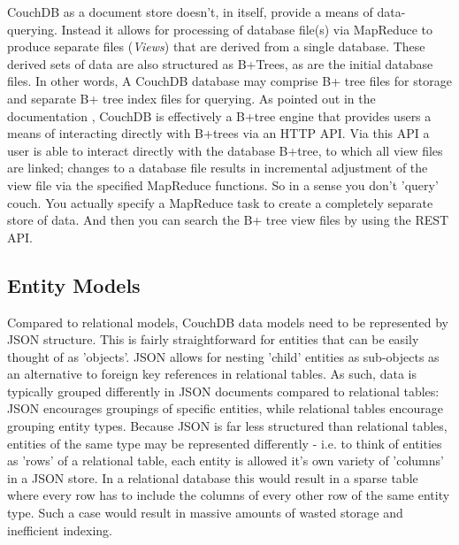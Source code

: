 CouchDB as a document store doesn't, in itself, provide a means of data-querying. Instead it allows for processing of database file(s) via MapReduce to produce separate files (\textit{Views}) that are derived from a single database. These derived sets of data are also structured as B+Trees, as are the initial database files. In other words, A CouchDB database may comprise B+ tree files for storage and separate B+ tree index files for querying. As pointed out in the documentation \cite{couchguide}, CouchDB is effectively a B+tree engine that provides users a means of interacting directly with B+trees via an HTTP API. Via this API a user is able to interact directly with the database B+tree, to which all view files are linked; changes to a database file results in incremental adjustment of the view file via the specified MapReduce functions. So in a sense you don’t 'query' couch. You actually specify a MapReduce task to create a completely separate store of data. And then you can search the B+ tree view files by using the REST API.

\subsection{Entity Models}
Compared to relational models, CouchDB data models need to be represented by JSON structure. This is fairly straightforward for entities that can be easily thought of as 'objects'. JSON allows for nesting 'child' entities as sub-objects as an alternative to foreign key references in relational tables. As such, data is typically grouped differently in JSON documents compared to relational tables: JSON encourages groupings of specific entities, while relational tables encourage grouping entity types. Because JSON is far less structured than relational tables, entities of the same type may be represented differently - i.e. to think of entities as 'rows' of a relational table, each entity is allowed it's own variety of 'columns' in a JSON store. In a relational database this would result in a sparse table where every row has to include the columns of every other row of the same entity type. Such a case would result in massive amounts of wasted storage and inefficient indexing.

